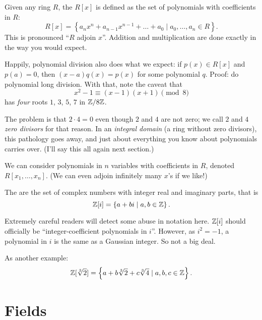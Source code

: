 \begin{example}
	Given any ring $R$,
	the  $R[x]$ is defined as the set of polynomials
	with coefficients in $R$:
	\[ R[x] = \left\{ a_n x^n+a_{n-1}x^{n-1}+\dots+a_0
		\mid a_0, \dots, a_n \in R \right\}. \]
	This is pronounced ``$R$ adjoin $x$''.
	Addition and multiplication are done exactly in the way you would expect.
\end{example}
\begin{remark}
	Happily, polynomial division also does what we expect:
	if $p(x) \in R[x]$ and $p(a) = 0$,
	then $(x-a)q(x) = p(x)$ for some polynomial $q$.
	Proof: do polynomial long division.
	With that, note the caveat that
	\[ x^2-1 \equiv (x-1)(x+1) \pmod 8 \]
	has \emph{four} roots $1$, $3$, $5$, $7$ in $\mathbb Z/8\mathbb Z$.

	The problem is that $2 \cdot 4 = 0$ even though $2$ and $4$ are not zero;
	we call $2$ and $4$ \emph{zero divisors} for that reason.
	In an \emph{integral domain} (a ring without zero divisors),
	this pathology goes away,
	and just about everything you know about polynomials carries over.
	(I'll say this all again next section.)
\end{remark}
\begin{example}
	We can consider polynomials in $n$ variables with coefficients in $R$,
	denoted $R[x_1, \dots, x_n]$.
	(We can even adjoin infinitely many $x$'s if we like!)
\end{example}

\begin{example}
	The  are the set of complex numbers
	with integer real and imaginary parts, that is
	\[ \mathbb Z[i] = \left\{ a+bi \mid a,b \in \mathbb Z \right\}. \]
\end{example}
\begin{abuse}
	Extremely careful readers will detect some abuse in notation here.
	$\mathbb Z[i]$ should officially be
	``integer-coefficient polynomials in $i$''.
	However, as $i^2=-1$, a polynomial in $i$ is the same as
	a Gaussian integer. So not a big deal.
\end{abuse}
\begin{example}
	As another example:
	\[ \mathbb Z[\sqrt[3]{2}] = \left\{ a + b\sqrt[3]{2} + c\sqrt[3]4
		\mid a,b,c \in \mathbb Z \right\}. \]
\end{example}

\section{Fields}

